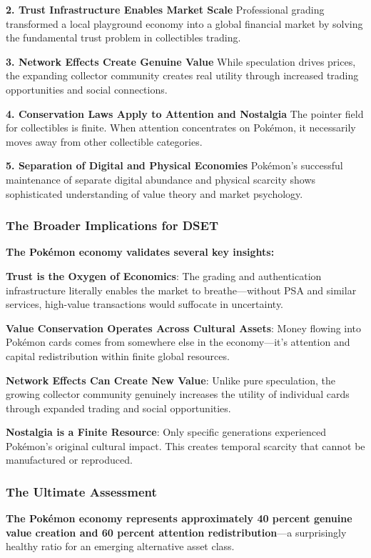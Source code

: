 \documentclass[11pt,oneside]{book}
\begin{document}
\textbf{2. Trust Infrastructure Enables Market Scale}
Professional grading transformed a local playground economy into a global financial market by solving the fundamental trust problem in collectibles trading.

\textbf{3. Network Effects Create Genuine Value}
While speculation drives prices, the expanding collector community creates real utility through increased trading opportunities and social connections.

\textbf{4. Conservation Laws Apply to Attention and Nostalgia}
The pointer field for collectibles is finite. When attention concentrates on Pokémon, it necessarily moves away from other collectible categories.

\textbf{5. Separation of Digital and Physical Economies}
Pokémon's successful maintenance of separate digital abundance and physical scarcity shows sophisticated understanding of value theory and market psychology.

\subsubsection{The Broader Implications for DSET}

\textbf{The Pokémon economy validates several key insights:}

\textbf{Trust is the Oxygen of Economics}: The grading and authentication infrastructure literally enables the market to breathe—without PSA and similar services, high-value transactions would suffocate in uncertainty.

\textbf{Value Conservation Operates Across Cultural Assets}: Money flowing into Pokémon cards comes from somewhere else in the economy—it's attention and capital redistribution within finite global resources.

\textbf{Network Effects Can Create New Value}: Unlike pure speculation, the growing collector community genuinely increases the utility of individual cards through expanded trading and social opportunities.

\textbf{Nostalgia is a Finite Resource}: Only specific generations experienced Pokémon's original cultural impact. This creates temporal scarcity that cannot be manufactured or reproduced.

\subsubsection{The Ultimate Assessment}

\textbf{The Pokémon economy represents approximately 40 percent genuine value creation and 60 percent attention redistribution}—a surprisingly healthy ratio for an emerging alternative asset class.
\end{document}
